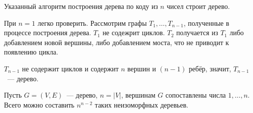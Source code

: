 \begin{statement}
	Указанный алгоритм построения дерева по коду из $n$ чисел строит дерево.
\end{statement}
\begin{proofmathind}
	\indbase При $n = 1$ легко проверить.
	\indstep Рассмотрим графы $T_1, \ldots, T_{n-1}$, полученные в процессе построения дерева. $T_1$ не содежрит циклов. $T_2$ получается из $T_1$ либо добавлением новой вершины, либо добавлением моста, что не приводит к появлению цикла.
	
	$T_{n-1}$ не содержит циклов и содержит $n$ вершин и $(n - 1)$ ребёр, значит, $T_{n-1}$~--- дерево.
	\indend
\end{proofmathind}

\begin{theorem}[Кэли]
	Пусть $G = (V, E)$~--- дерево, $n = |V|$, вершинам $G$ сопоставлены числа $1, \ldots, n$. Всего можно составить $n^{n-2}$ таких неизоморфных деревьев.
\end{theorem}